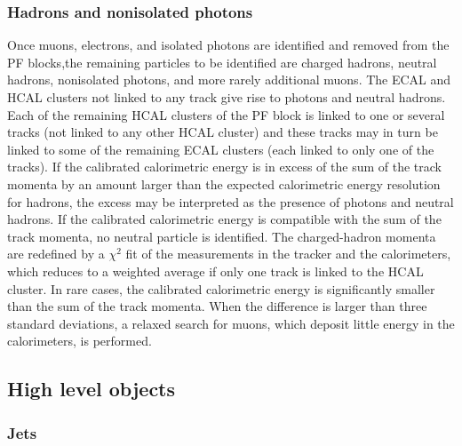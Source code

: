 \subsubsection{Hadrons and nonisolated photons} 
Once muons, electrons, and isolated photons are identified and removed from the PF blocks,the remaining particles to be identified are charged hadrons, neutral hadrons, nonisolated photons, and more rarely additional muons. The ECAL and HCAL clusters not linked to any track give rise to photons and neutral hadrons. Each of the remaining HCAL clusters of the PF block is linked to one or several tracks (not linked to any other HCAL cluster) and these tracks may in turn be linked to some of the remaining ECAL clusters (each linked to only one of the tracks). If the calibrated calorimetric energy is in excess of the sum of the track momenta by an amount larger than the expected calorimetric energy resolution for hadrons, the excess may be interpreted as the presence of photons and neutral hadrons. If the calibrated calorimetric energy is compatible with the sum of the track momenta, no neutral particle is identified.  The charged-hadron momenta are redefined by a $\chi^2$ fit of the measurements in the tracker and the calorimeters,  which reduces to a weighted average if only one track is linked to the HCAL cluster. In  rare  cases,  the  calibrated  calorimetric  energy  is  significantly  smaller  than  the  sum  of  the track momenta. When the difference is larger than three standard deviations, a relaxed search for muons,  which deposit little energy in the calorimeters,  is performed.


\subsection{High level objects}

\subsubsection{Jets}
\label{sec:jet_clustering}

